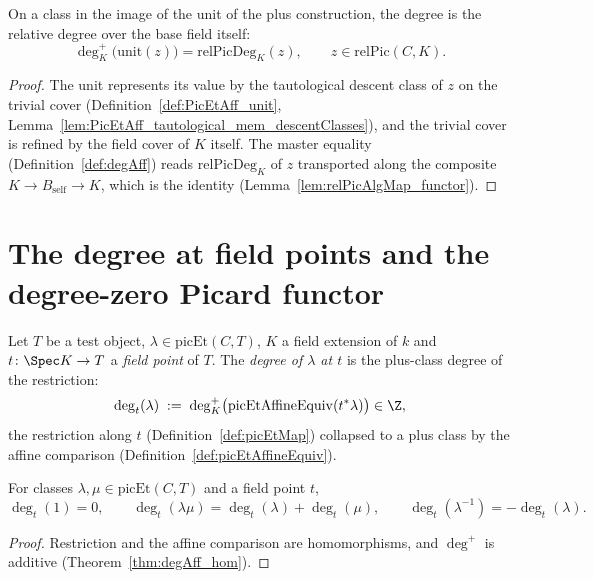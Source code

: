 \begin{theorem}
  \label{thm:degAff_unit}
  \leanok
  On a class in the image of the unit of the plus construction, the degree is the relative
  degree over the base field itself:
  \[
    \deg^{+}_K\bigl(\mathrm{unit}(z)\bigr) = \mathrm{relPicDeg}_K(z),
    \qquad z \in \mathrm{relPic}(C,K).
  \]
\end{theorem}
\begin{proof}
  \leanok
  The unit represents its value by the tautological descent class of \(z\) on the trivial
  cover (Definition~\ref{def:PicEtAff_unit},
  Lemma~\ref{lem:PicEtAff_tautological_mem_descentClasses}), and the trivial cover is
  refined by the field cover of \(K\) itself. The master equality
  (Definition~\ref{def:degAff}) reads \(\mathrm{relPicDeg}_K\) of \(z\) transported along the
  composite \(K \to B_{\mathrm{self}} \to K\), which is the identity
  (Lemma~\ref{lem:relPicAlgMap_functor}).
\end{proof}

\section{The degree at field points and the degree-zero Picard functor}
\label{sec:pic0}

\begin{definition}
  \label{def:degAt}
  \leanok
  Let \(T\) be a test object, \(\lambda \in \mathrm{picEt}(C,T)\), \(K\) a field extension of
  \(k\) and \(t \colon \Spec K \to T\) a \emph{field point} of \(T\). The \emph{degree of
  \(\lambda\) at \(t\)} is the plus-class degree of the restriction:
  \[
    \deg_t(\lambda) \;:=\; \deg^{+}_K\bigl(\mathrm{picEtAffineEquiv}(t^{*}\lambda)\bigr) \in \Z ,
  \]
  the restriction along \(t\) (Definition~\ref{def:picEtMap}) collapsed to a plus class by
  the affine comparison (Definition~\ref{def:picEtAffineEquiv}).
\end{definition}

\begin{lemma}
  \label{lem:degAt_hom}
  \leanok
  For classes \(\lambda, \mu \in \mathrm{picEt}(C,T)\) and a field point \(t\),
  \[
    \deg_t(1) = 0, \qquad
    \deg_t(\lambda\mu) = \deg_t(\lambda) + \deg_t(\mu), \qquad
    \deg_t(\lambda^{-1}) = -\deg_t(\lambda).
  \]
\end{lemma}
\begin{proof}
  \leanok
  Restriction and the affine comparison are homomorphisms, and \(\deg^{+}\) is additive
  (Theorem~\ref{thm:degAff_hom}).
\end{proof}

